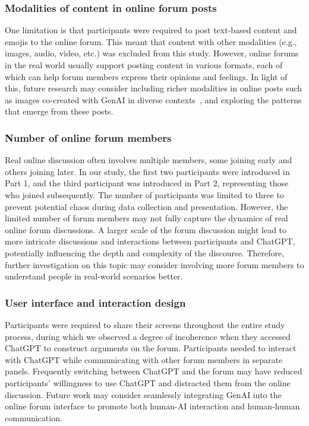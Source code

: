 \subsubsection{Modalities of content in online forum posts}
One limitation is that participants were required to post text-based content and emojis to the online forum. This meant that content with other modalities (e.g., images, audio, video, etc.) was excluded from this study. However, online forums in the real world usually support posting content in various formats, each of which can help forum members express their opinions and feelings. In light of this, future research may consider including richer modalities in online posts such as images co-created with GenAI in diverse contexts~\cite{fu_being_2024, lc_speculative_2024, lc_together_2023, lc_time_2024}, and exploring the patterns that emerge from these posts.

\subsubsection{Number of online forum members}
Real online discussion often involves multiple members, some joining early and others joining later. In our study, the first two participants were introduced in Part 1, and the third participant was introduced in Part 2, representing those who joined subsequently. The number of participants was limited to three to prevent potential chaos during data collection and presentation. However, the limited number of forum members may not fully capture the dynamics of real online forum discussions. A larger scale of the forum discussion might lead to more intricate discussions and interactions between participants and ChatGPT, potentially influencing the depth and complexity of the discourse. Therefore, further investigation on this topic may consider involving more forum members to understand people in real-world scenarios better.

\subsubsection{User interface and interaction design}
Participants were required to share their screens throughout the entire study process, during which we observed a degree of incoherence when they accessed ChatGPT to construct arguments on the forum. Participants needed to interact with ChatGPT while communicating with other forum members in separate panels. Frequently switching between ChatGPT and the forum may have reduced participants' willingness to use ChatGPT and distracted them from the online discussion. Future work may consider seamlessly integrating GenAI into the online forum interface to promote both human-AI interaction and human-human communication.

